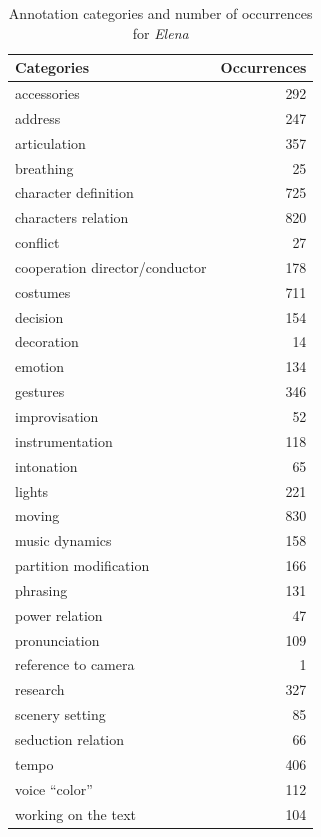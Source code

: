 \documentclass[conference]{IEEEtran}
\begin{document}
\begin{table}
\centering
\begin{tabular}{|p{4cm}|r|}
\hline 
Categories & Occurrences \\ 
\hline 
accessories & 292 \\ 
\hline 
address & 247 \\ 
\hline 
articulation & 357 \\ 
\hline 
breathing & 25 \\ 
\hline 
character definition & 725 \\ 
\hline 
characters relation & 820 \\ 
\hline 
conflict & 27 \\ 
\hline 
cooperation director/conductor & 178 \\ 
\hline 
costumes & 711 \\ 
\hline 
decision & 154 \\ 
\hline 
decoration & 14 \\ 
\hline 
emotion & 134 \\ 
\hline 
gestures & 346 \\ 
\hline 
improvisation & 52 \\ 
\hline 
instrumentation & 118 \\ 
\hline 
intonation & 65 \\ 
\hline 
lights & 221 \\ 
\hline 
moving & 830 \\ 
\hline 
music dynamics & 158 \\ 
\hline 
partition modification & 166 \\ 
\hline 
phrasing & 131 \\ 
\hline 
power relation & 47 \\ 
\hline 
pronunciation & 109 \\ 
\hline 
reference to camera & 1 \\ 
\hline 
research & 327 \\ 
\hline 
scenery setting & 85 \\ 
\hline 
seduction relation & 66 \\ 
\hline 
tempo & 406 \\ 
\hline 
voice ``color'' & 112 \\ 
\hline 
working on the text & 104 \\ 
\hline 
\end{tabular} 
\label{table:categories2}
\caption{Annotation categories and number of occurrences for \emph{Elena}}
\end{table}  
 
\end{document}
